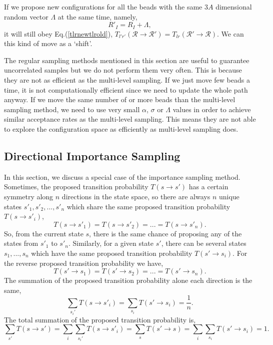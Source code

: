 \documentclass[12pt,letterpaper,UTF8]{report}
\begin{document}
If we propose new configurations for all the beads with the same $3A$ dimensional random vector $\Lambda$ at the same time, namely,
\begin{equation}
 R'_I=R_I+\Lambda,
 \label{shiftmove}
\end{equation}
it will still obey Eq.(\ref{tlrnewtlrold}), $T_{l'r'}(\mathcal{R} \rightarrow \mathcal{R}') = T_{lr}(\mathcal{R}' \rightarrow \mathcal{R}) $.
We can this kind of move as a `shift'.

The regular sampling methods mentioned in this section are useful to guarantee uncorrelated samples but we do not perform them very often.
This is because they are not as efficient as the multi-level sampling. If we just move few beads a time, it is not computationally efficient since we need to update the whole path anyway.
If we move the same number of or more beads than the multi-level sampling method,
we need to use very small $\alpha$, $\sigma$ or $\Lambda$ values in order to achieve similar acceptance rates as the multi-level sampling.
This means they are not able to explore the configuration space as efficiently as multi-level sampling does.


\subsection{Directional Importance Sampling}
\label{secimpsampling}

In this section, we discuss a special case of the importance sampling method.
Sometimes, the proposed transition probability $T(s\rightarrow s')$ has a certain symmetry along $n$ directions in the state space, so there are always $n$ unique states $s'_1,s'_2,...,s'_n$ which share the same proposed transition probability $T(s\rightarrow s'_i)$,
\begin{equation}
T(s\rightarrow s'_1) = T(s\rightarrow s'_2) = ... =T(s\rightarrow s'_n).
 \label{Timpnew}
\end{equation}
So, from the current state $s$, there is the same chance of proposing any of the states from $s'_1$ to $s'_n$.
Similarly, for a given state $s'$, there can be several states $s_1,...,s_n$ which have the same proposed transition probability $T(s'\rightarrow s_i)$. For the reverse proposed transition probability we have,
\begin{equation}
T(s'\rightarrow s_1) = T(s'\rightarrow s_2) = ... = T(s'\rightarrow s_n).
 \label{Timprev}
\end{equation}
The summation of the proposed transition probability alone each direction is the same,
\begin{equation}
\sum_{s_i'}T(s\rightarrow s'_i) = \sum_{s_i}T(s'\rightarrow s_i)
= \frac{1}{n}.
 \label{T1on}
\end{equation}
The total summation of the proposed transition probability is,
\begin{equation}
\!\!\!
\sum_{s'}T(s\rightarrow s') = \sum_i \sum_{s_i'}T(s\rightarrow s'_i) =\sum_{s}T(s'\rightarrow s) = \sum_i \sum_{s_i}T(s'\rightarrow s_i)= 1.
 \label{sumT1on}
\end{equation}
\end{document}
